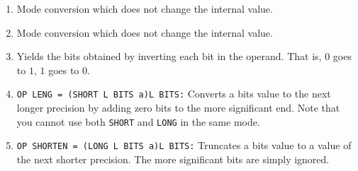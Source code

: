 \begin{enumerate}
\item {} \newline
Mode conversion which does not change the internal value.
\item {} \newline
Mode conversion which does not change the internal value.
\item {} \newline
Yields the bits obtained by inverting each bit in the operand. That is,
$0$ goes to $1$, $1$ goes to $0$.
\item {} \newline
\verb|OP LENG = (SHORT L BITS a)L BITS:| \newline
Converts a bits value to the next longer precision by adding zero bits
to the more significant end. Note that you cannot use both \verb|SHORT|
and \verb|LONG| in the same mode.
\item {} \newline
\verb|OP SHORTEN = (LONG L BITS a)L BITS:|\newline
Truncates a bits value to a value of the next shorter precision. The
more significant bits are simply ignored.
\end{enumerate}

